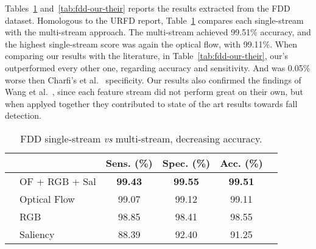 \documentclass[conference]{IEEEtran}
\begin{document}
Tables~\ref{tab:fdd-ensem} and~\ref{tab:fdd-our-their} reports the results extracted from the FDD dataset. Homologous to the URFD report, Table~\ref{tab:fdd-ensem} compares each single-stream with the multi-stream approach. The multi-stream achieved 99.51\% accuracy, and the highest single-stream score was again the optical flow, with 99.11\%. When comparing our results with the literature, in Table~\ref{tab:fdd-our-their}, our's outperformed every other one, regarding accuracy and sensitivity. And was 0.05\% worse then Charfi's et al.~\cite{charfi2013optimised} specificity. Our results also confirmed the findings of Wang et al.~\cite{wang2015towards}, since each feature stream did not perform great on their own, but when applyed together they contributed to state of the art results towards fall detection.

\begin{table}[]
\centering
\caption{FDD single-stream \textit{vs} multi-stream, decreasing accuracy.}
\label{tab:fdd-ensem}
\begin{tabular}{llcccl}
\hline
 &  & Sens. (\%) & Spec. (\%) & Acc. (\%) &  \\ \hline
 & OF + RGB + Sal & \textbf{99.43} & \textbf{99.55} & \textbf{99.51} &  \\
 & Optical Flow & 99.07             & 99.12             & 99.11             &  \\
 & RGB & 98.85             & 98.41             & 98.55             &  \\
 & Saliency & 88.39             & 92.40             & 91.25             & \\ \hline
\end{tabular}
\end{table}
\end{document}
